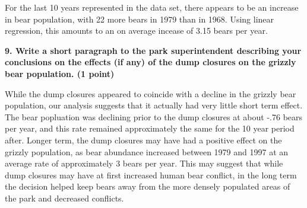 \documentclass[]{article}
\newenvironment{Shaded}{\begin{snugshade}}{\end{snugshade}}
\newcommand{\KeywordTok}[1]{\textcolor[rgb]{0.13,0.29,0.53}{\textbf{#1}}}
\newcommand{\DecValTok}[1]{\textcolor[rgb]{0.00,0.00,0.81}{#1}}
\newcommand{\StringTok}[1]{\textcolor[rgb]{0.31,0.60,0.02}{#1}}
\newcommand{\CommentTok}[1]{\textcolor[rgb]{0.56,0.35,0.01}{\textit{#1}}}
\newcommand{\OperatorTok}[1]{\textcolor[rgb]{0.81,0.36,0.00}{\textbf{#1}}}
\newcommand{\NormalTok}[1]{#1}
\begin{document}
\begin{Shaded}
\end{Shaded}

For the last 10 years represented in the data set, there appears to be
an increase in bear population, with 22 more bears in 1979 than in 1968.
Using linear regression, this amounts to an on average incease of 3.15
bears per year.

\textbf{9. Write a short paragraph to the park superintendent describing
your conclusions on the effects (if any) of the dump closures on the
grizzly bear population. (1 point)}

While the dump closures appeared to coincide with a decline in the
grizzly bear population, our analysis suggests that it actually had very
little short term effect. The bear popluation was declining prior to the
dump closures at about -.76 bears per year, and this rate remained
approximately the same for the 10 year period after. Longer term, the
dump closures may have had a positive effect on the grizzly population,
as bear abundance increased between 1979 and 1997 at an average rate of
approximately 3 bears per year. This may suggest that while dump
closures may have at first increased human bear conflict, in the long
term the decision helped keep bears away from the more densely populated
areas of the park and decreased conflicts.
\end{document}
